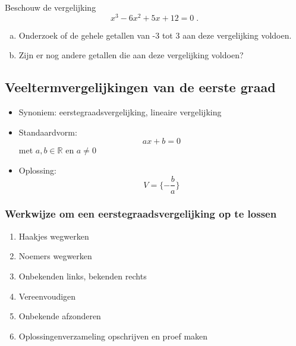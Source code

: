 \documentclass[12pt,twoside,a4paper]{article}
\begin{document}
\begin{oefening}
  Beschouw de vergelijking
  $$x^3-6x^2+5x+12=0\;.$$
  \begin{enumerate}[(a)]
  \item Onderzoek of de gehele getallen van -3 tot 3 aan deze vergelijking voldoen.
  \item Zijn er nog andere getallen die aan deze vergelijking voldoen?
  \end{enumerate}
\end{oefening}

\subsection{Veeltermvergelijkingen van de eerste graad}

\begin{itemize}
\item Synoniem: eerstegraadsvergelijking, lineaire vergelijking
\item Standaardvorm:
  $$ax + b = 0$$
  met $a, b \in \mathbb{R}$ en $a\neq 0$
\item Oplossing:
  $$V=\{-\dfrac{b}{a}\}$$
\end{itemize}

\subsubsection*{Werkwijze om een eerstegraadsvergelijking op te lossen}
\begin{enumerate}
\item Haakjes wegwerken
\item Noemers wegwerken
\item Onbekenden links, bekenden rechts
\item Vereenvoudigen
\item Onbekende afzonderen
\item Oplossingenverzameling opschrijven en proef maken
\end{enumerate}
\end{document}
